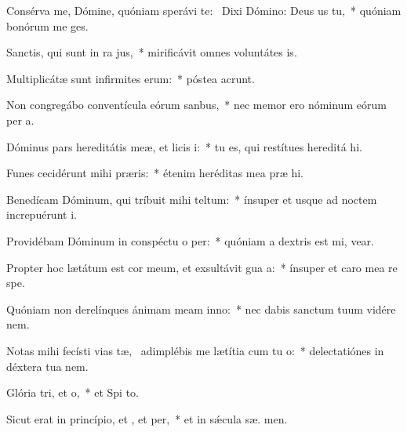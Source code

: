 \item Consérva me, Dómine, quóniam sperávi  te:~\pscross{} Dixi Dómino: Deus us  tu,~* quóniam bonórum me  ges.
\item Sanctis, qui sunt in ra jus,~* mirificávit omnes voluntátes   is.
\item Multiplicátæ sunt infirmites erum:~* póstea acrunt.
\item Non congregábo conventícula eórum  sanbus,~* nec memor ero nóminum eórum per  a.
\item Dóminus pars hereditátis meæ, et licis i:~* tu es, qui restítues hereditá  hi.
\item Funes cecidérunt mihi  præris:~* étenim heréditas mea præ  hi.
\item Benedícam Dóminum, qui tríbuit mihi teltum:~* ínsuper et usque ad noctem increpuérunt   i.
\item Providébam Dóminum in conspéctu o per:~* quóniam a dextris est mi,  vear.
\item Propter hoc lætátum est cor meum, et exsultávit gua a:~* ínsuper et caro mea re  spe.
\item Quóniam non derelínques ánimam meam  inno:~* nec dabis sanctum tuum vidére nem.
\item Notas mihi fecísti vias tæ,~\pscross{} adimplébis me lætítia cum tu o:~* delectatiónes in déxtera tua   nem.
\item Glória tri, et o,~* et Spi to.
\item Sicut erat in princípio, et , et per,~* et in sǽcula sæ. men.
